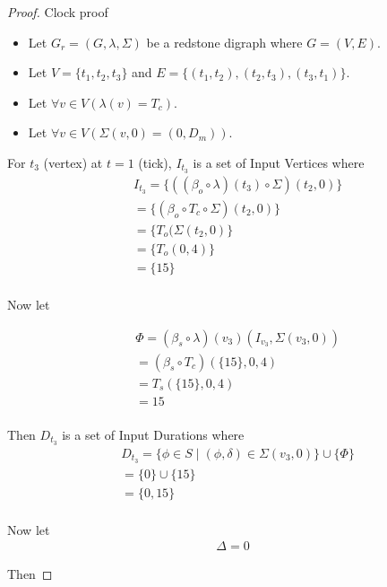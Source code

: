 \documentclass{article}
\begin{document}
\begin{proof} Clock proof
	
	\begin{itemize}
		\item Let \(G_{r} = (G, \lambda, \Sigma)\) be a redstone digraph where \(G = (V, E)\). 
		\item Let \(V = \{t_{1}, t_{2}, t_{3}\}\) and \(E = \{(t_{1}, t_{2}), (t_{2}, t_{3}), (t_{3}, t_{1})\}\).
		\item Let \(\forall v \in V(\lambda(v) = T_{c})\).
		\item Let \(\forall v \in V(\Sigma(v, 0) = (0, D_{m}))\).
	\end{itemize}

	For \(t_{3}\) (vertex) at \(t = 1\) (tick), \(I_{t_{3}}\) is a set of Input Vertices where 
	\begin{align*}
		& I_{t_{3}} = \{((\beta_{o} \circ \lambda)(t_{3}) \circ \Sigma)(t_{2}, 0)\} \\
		& = \{(\beta_{o} \circ T_{c} \circ \Sigma)(t_{2}, 0)\} \\
		& = \{T_{o}(\Sigma(t_{2}, 0)\} \\
		& = \{T_{o}(0, 4)\} \\
		& = \{15\} \\
	\end{align*}

	Now let

	\begin{align*}
		& \Phi = (\beta_{s} \circ \lambda)(v_{3})(I_{v_{3}}, \Sigma(v_{3}, 0)) \\
		& = (\beta_{s} \circ T_{c})(\{15\}, 0, 4) \\
		& = T_{s}(\{15\}, 0, 4) \\
		& =  15 \\
	\end{align*}
	
	Then \(D_{t_{3}}\) is a set of Input Durations where
	\begin{align*}
		& D_{t_{3}} = \{\phi \in S \mid (\phi, \delta) \in \Sigma(v_{3}, 0)\} \cup \{\Phi\} \\
		& = \{0\} \cup \{15\} \\
		& = \{0, 15\} \\
	\end{align*}

	Now let 
	\begin{align*}
		\Delta = 0
	\end{align*}

	Then
	

\end{proof}
\end{document}
